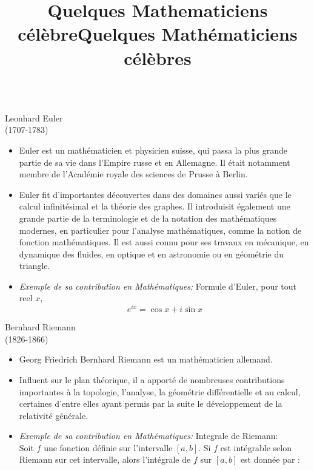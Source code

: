 \documentclass{beamer}
\title{\textcolor{bleunuit}{Quelques Mathematiciens célèbre}}
\title{\textbf{\Huge Quelques Mathématiciens célèbres}}
\date{}
\begin{document}
 
 \begin{frame}[fragile]
  \maketitle
   \begin{columns}[T]
    \begin{column}{.50\textwidth}
     \begin{block}{Leonhard Euler\\(1707-1783)}
      \begin{itemize}
       \item Euler est un mathématicien et physicien suisse, qui passa la plus grande partie de sa vie dans l'Empire russe et en Allemagne. Il était notamment membre de l'Académie royale des sciences de Prusse à Berlin.
       \item Euler fit d'importantes découvertes dans des domaines aussi variés que le calcul infinitésimal et la théorie des graphes. Il introduisit également une grande partie de la terminologie et de la notation des mathématiques modernes, en particulier pour l'analyse mathématiques, comme la notion de fonction mathématiques. Il est aussi connu pour ses travaux en mécanique, en dynamique des fluides, en optique et en astronomie ou en géométrie du triangle. 
       \item \textit{Exemple de sa contribution en Mathématiques:} Formule d'Euler, pour tout reel \(x\),
   \[
      e^{ix} = \cos x + i\sin x
   \]      
     \end{itemize} 
   \end{block}
  \begin{block}{Bernhard Riemann\\(1826-1866)}
   \begin{itemize}
    \item Georg Friedrich Bernhard Riemann est un mathématicien allemand.
    \item Influent sur le plan théorique, il a apporté de nombreuses contributions importantes à la topologie, l'analyse, la géométrie différentielle et au calcul, certaines d'entre elles ayant permis par la suite le développement de la relativité générale.
    \item \textit{Exemple de sa contribution en Mathématiques:} Integrale de Riemann:\\
  Soit \( f \) une fonction définie sur l'intervalle \( [a, b] \). Si \( f \) est intégrable selon Riemann sur cet intervalle, alors l'intégrale de \( f \) sur \( [a, b] \) est donnée par :


\end{itemize}
\end{block}
\end{column}
\end{columns}
\end{frame}
\end{document}
